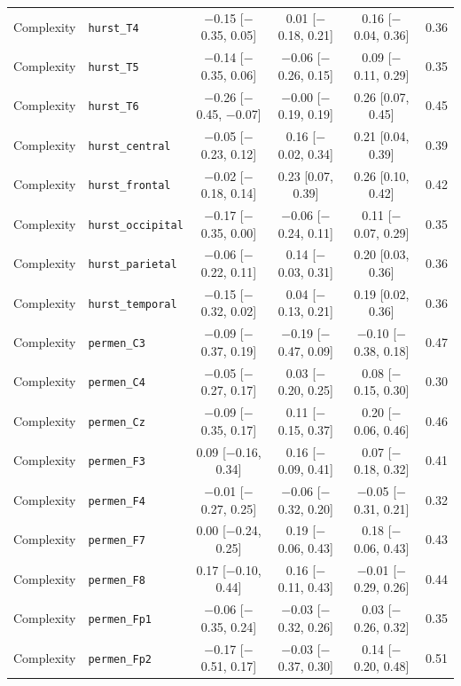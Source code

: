 {\begin{longtable}{llcccc}
Complexity & \texttt{hurst\_T4} & $-$0.15 [$-$0.35, 0.05] & 0.01 [$-$0.18, 0.21] & 0.16 [$-$0.04, 0.36] & 0.36 \\
Complexity & \texttt{hurst\_T5} & $-$0.14 [$-$0.35, 0.06] & $-$0.06 [$-$0.26, 0.15] & 0.09 [$-$0.11, 0.29] & 0.35 \\
Complexity & \texttt{hurst\_T6} & $-$0.26 [$-$0.45, $-$0.07] & $-$0.00 [$-$0.19, 0.19] & 0.26 [0.07, 0.45] & 0.45 \\
Complexity & \texttt{hurst\_central} & $-$0.05 [$-$0.23, 0.12] & 0.16 [$-$0.02, 0.34] & 0.21 [0.04, 0.39] & 0.39 \\
Complexity & \texttt{hurst\_frontal} & $-$0.02 [$-$0.18, 0.14] & 0.23 [0.07, 0.39] & 0.26 [0.10, 0.42] & 0.42 \\
Complexity & \texttt{hurst\_occipital} & $-$0.17 [$-$0.35, 0.00] & $-$0.06 [$-$0.24, 0.11] & 0.11 [$-$0.07, 0.29] & 0.35 \\
Complexity & \texttt{hurst\_parietal} & $-$0.06 [$-$0.22, 0.11] & 0.14 [$-$0.03, 0.31] & 0.20 [0.03, 0.36] & 0.36 \\
Complexity & \texttt{hurst\_temporal} & $-$0.15 [$-$0.32, 0.02] & 0.04 [$-$0.13, 0.21] & 0.19 [0.02, 0.36] & 0.36 \\
Complexity & \texttt{permen\_C3} & $-$0.09 [$-$0.37, 0.19] & $-$0.19 [$-$0.47, 0.09] & $-$0.10 [$-$0.38, 0.18] & 0.47 \\
Complexity & \texttt{permen\_C4} & $-$0.05 [$-$0.27, 0.17] & 0.03 [$-$0.20, 0.25] & 0.08 [$-$0.15, 0.30] & 0.30 \\
Complexity & \texttt{permen\_Cz} & $-$0.09 [$-$0.35, 0.17] & 0.11 [$-$0.15, 0.37] & 0.20 [$-$0.06, 0.46] & 0.46 \\
Complexity & \texttt{permen\_F3} & 0.09 [$-$0.16, 0.34] & 0.16 [$-$0.09, 0.41] & 0.07 [$-$0.18, 0.32] & 0.41 \\
Complexity & \texttt{permen\_F4} & $-$0.01 [$-$0.27, 0.25] & $-$0.06 [$-$0.32, 0.20] & $-$0.05 [$-$0.31, 0.21] & 0.32 \\
Complexity & \texttt{permen\_F7} & 0.00 [$-$0.24, 0.25] & 0.19 [$-$0.06, 0.43] & 0.18 [$-$0.06, 0.43] & 0.43 \\
Complexity & \texttt{permen\_F8} & 0.17 [$-$0.10, 0.44] & 0.16 [$-$0.11, 0.43] & $-$0.01 [$-$0.29, 0.26] & 0.44 \\
Complexity & \texttt{permen\_Fp1} & $-$0.06 [$-$0.35, 0.24] & $-$0.03 [$-$0.32, 0.26] & 0.03 [$-$0.26, 0.32] & 0.35 \\
Complexity & \texttt{permen\_Fp2} & $-$0.17 [$-$0.51, 0.17] & $-$0.03 [$-$0.37, 0.30] & 0.14 [$-$0.20, 0.48] & 0.51 \\

\end{longtable}}
